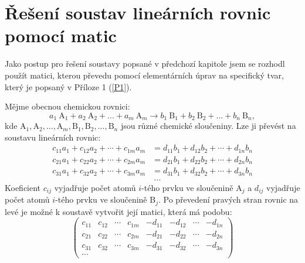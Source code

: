 \documentclass[12pt,a4paper]{report}
\newcommand{\n}[1]{\mbox{#1}}
\newcommand{\sipka}{\rightarrow}
\begin{document}
\chapter{Řešení soustav lineárních rovnic pomocí matic}
Jako postup pro řešení soustavy popsané v předchozí kapitole jsem se rozhodl použít matici, kterou převedu pomocí elementárních úprav na specifický tvar, který je popsaný v Příloze 1 (\ref{P1}).

Mějme obecnou chemickou rovnici:
$$a_1~\n{A}_1 + a_2~\n{A}_2 + ... + a_m~\n{A}_m \sipka b_1~\n{B}_1 + b_2~\n{B}_2 + ...+ b_n~\n{B}_n,$$
kde $\n{A}_1, \n{A}_2, ..., \n{A}_m, \n{B}_1, \n{B}_2, ..., \n{B}_n$ jsou různé chemické sloučeniny. Lze ji převést na soustavu lineárních rovnic:
\begin{align*}
	c_{11}a_{1} + c_{12}a_{2} + \cdots + c_{1m}a_{m} &= d_{11}b_{1} + d_{12}b_{2} + \cdots + d_{1n}b_{n}\\
	c_{21}a_{1} + c_{22}a_{2} + \cdots + c_{2m}a_{m} &= d_{21}b_{1} + d_{22}b_{2} + \cdots + d_{2n}b_{n}\\
	c_{31}a_{1} + c_{32}a_{2} + \cdots + c_{3m}a_{m} &= d_{31}b_{1} + d_{32}b_{2} + \cdots + d_{3n}b_{n}\\
	&~...
\end{align*}
Koeficient $ c_{ij} $ vyjadřuje počet atomů $ i $-tého prvku ve sloučenině A$ _j $ a $ d_{ij} $ vyjadřuje počet atomů $ i $-tého prvku ve sloučenině B$ _j $. Po převedení pravých stran rovnic na levé je možné k soustavě vytvořit její matici, která má podobu:
$$\begin{pmatrix}
	c_{11} & c_{12} & \cdots & c_{1m} & -d_{11} & -d_{12} &\cdots& -d_{1n}\\
	c_{21} & c_{22} & \cdots & c_{2m} & -d_{21} & -d_{22} &\cdots& -d_{2n}\\
	c_{31} & c_{32} & \cdots & c_{3m} & -d_{31} & -d_{32} &\cdots& -d_{3n}\\
	\cdots
\end{pmatrix}$$
\end{document}

